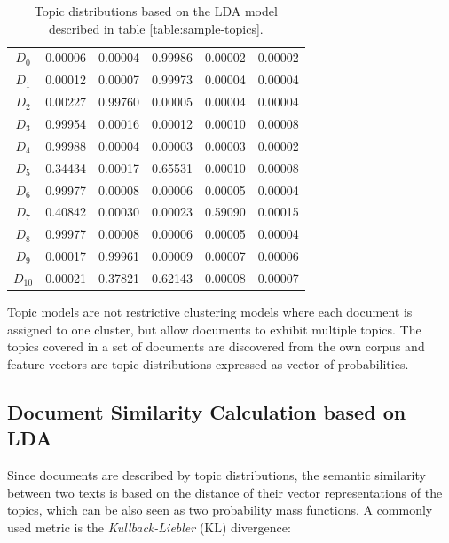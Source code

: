 \begin{table}[!htbp]
\centering%
\begin{tabularx}{\linewidth}{CCCCCC}
\toprule
{} &  &  &  &  &  \\
\midrule
\midrule
$D_0$ & 0.00006 & 0.00004 & 0.99986 & 0.00002 & 0.00002\\
\midrule
$D_1$ & 0.00012 & 0.00007 & 0.99973 & 0.00004 & 0.00004 \\
\midrule
$D_2$ & 0.00227 & 0.99760  & 0.00005 & 0.00004 & 0.00004\\
\midrule
$D_3$ & 0.99954 & 0.00016 & 0.00012 & 0.00010 & 0.00008 \\
\midrule
$D_4$ & 0.99988 & 0.00004 & 0.00003 & 0.00003 & 0.00002\\
\midrule
$D_5$ & 0.34434 & 0.00017 & 0.65531 & 0.00010 & 0.00008\\
\midrule
$D_6$ & 0.99977 & 0.00008 & 0.00006 & 0.00005 & 0.00004\\
\midrule
$D_7$ & 0.40842 & 0.00030 & 0.00023 & 0.59090 & 0.00015\\
\midrule
$D_8$ & 0.99977 & 0.00008 & 0.00006 & 0.00005 & 0.00004\\
\midrule
$D_9$ & 0.00017 & 0.99961 & 0.00009 & 0.00007 & 0.00006\\
\midrule
$D_{10}$ & 0.00021 & 0.37821 & 0.62143 & 0.00008 & 0.00007\\
\midrule
\bottomrule
\end{tabularx}
\caption{Topic distributions based on the LDA model described in table \ref{table:sample-topics}.}
\label{table:sample-doctopics}
\end{table}


Topic models are not restrictive clustering models where each document is assigned to one cluster, but allow documents to exhibit multiple topics. The topics covered in a set of documents are discovered from the own corpus and feature vectors are topic distributions expressed as vector of probabilities.


\subsection{Document Similarity Calculation based on LDA}\label{sec:doc-sim-lda}

Since documents are described by topic distributions, the semantic similarity between two texts is based on the distance of their vector representations of the topics, which can be also seen as two probability mass functions. A commonly used metric is the \textit{Kullback-Liebler} (KL) divergence:

